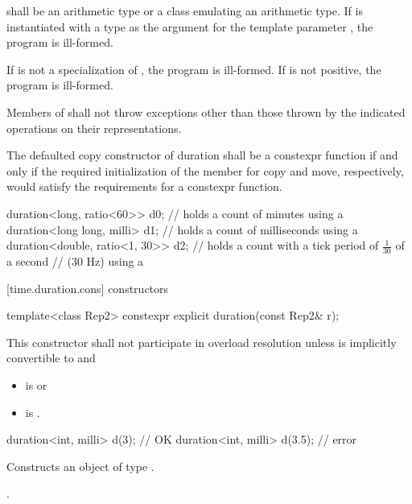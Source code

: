 \pnum
{} shall be an arithmetic type or a class emulating an arithmetic type.
If  is instantiated with a  type as the argument for the template
parameter , the program is ill-formed.

\pnum
If  is not a specialization of , the program is ill-formed.
If  is not positive, the program is ill-formed.

\pnum
Members of  shall not throw exceptions other than
those thrown by the indicated operations on their representations.

\pnum
The defaulted copy constructor of duration shall be a
constexpr function if and only if the required initialization
of the member  for copy and move, respectively, would
satisfy the requirements for a constexpr function.

\pnum
\begin{example}
\begin{codeblock}
duration<long, ratio<60>> d0;       // holds a count of minutes using a 
duration<long long, milli> d1;      // holds a count of milliseconds using a 
duration<double, ratio<1, 30>>  d2; // holds a count with a tick period of $\frac{1}{30}$ of a second
                                    // (30 Hz) using a 
\end{codeblock}
\end{example}

[time.duration.cons]{ constructors}

%
\begin{itemdecl}
template<class Rep2>
  constexpr explicit duration(const Rep2& r);
\end{itemdecl}

\begin{itemdescr}
\pnum
\remarks This constructor shall not participate in overload
resolution unless
 is implicitly convertible to  and
\begin{itemize}
\item {} is  or
\item {} is .
\end{itemize}
\begin{example}
\begin{codeblock}
duration<int, milli> d(3);          // OK
duration<int, milli> d(3.5);        // error
\end{codeblock}
\end{example}

\pnum
\effects Constructs an object of type .

\pnum
\postconditions {}.
\end{itemdescr}

